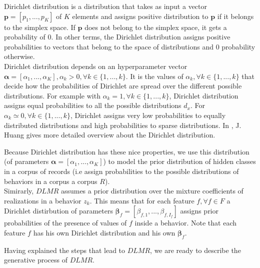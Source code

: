 Dirichlet distribution \cite{dirichlet_into} is a distribution that takes as input a vector $\mathbf{p}=[p_{1},...,p_{K}]$ of $K$ elements and assigns positive distribution to $\mathbf{p}$ if it belongs to the simplex space. If $\mathbf{p}$ does not belong to the simplex space, it gets a probability of $0$. In other terms, the Dirichlet distribution assigns positive probabilities to vectors that belong to the space of distributions and  $0$ probability otherwise.
\\Dirichlet distribution depends on an hyperparameter vector $\boldsymbol{\alpha}=[\alpha _{1},...,\alpha _{K}] ,\alpha _{k}> 0, \forall k\in \{1,...,k\}$. It is the values of $\alpha _{k}, \forall k\in \{1,...,k\}$ that decide how the probabilities of Dirichlet are spread over the different possible distributions. For example with $\alpha _{k}=1, \forall k\in \{1,...,k\}$, Dirichlet distribution assigns equal probabilities to all the possible distributions $d_{x}$. For $\alpha _{k}\simeq 0, \forall k\in \{1,...,k\}$, Dirichlet assigns very low probabilities to equally distributed distributions and high probabilities to sparse distributions. In \cite{dirichlet_into}, J. Huang gives more detailed overview about the Dirichlet distribution. \par

Because Dirichlet distribution has these nice properties, we use this distribution (of parameters $\boldsymbol{\alpha}=[\alpha _{1},...,\alpha _{K}]$) to model the prior distribution of hidden classes in a corpus of records (i.e assign probabilities to the possible distributions of behaviors in a corpus a corpus $R$).
\\Simirarly, $DLMR$ assumes a prior distribution over the mixture coefficients of realizations in a behavior $z_{k}$. This means that for each feature $f, \forall f \in F$ a Dirichlet distirbution of parameters $\boldsymbol{\beta }_{f}=[\beta _{f,1},...,\beta _{f,I_{f}}]$ assigns prior probabilities of the presence of values of $f$ inside a behavior. Note that each feature $f$ has his own Dirichlet distribution and his own $\boldsymbol{\beta }_{f}$. \par

Having explained the steps that lead to $DLMR$, we are ready to describe the generative process of $DLMR$.
